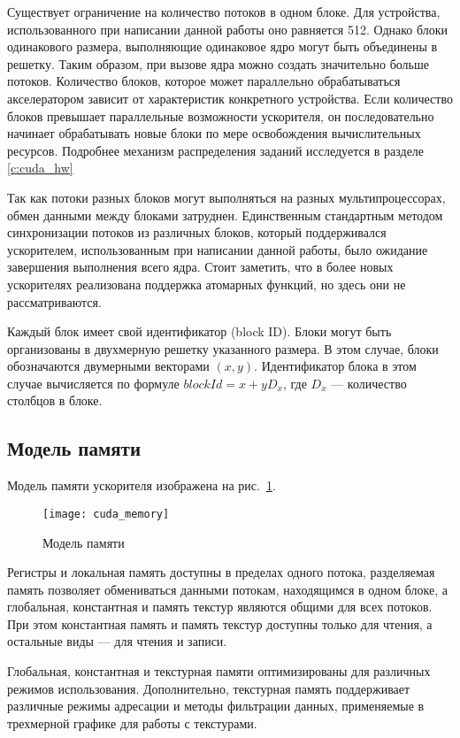 Существует ограничение на количество потоков в одном блоке. Для устройства, использованного при написании данной работы оно равняется 512. Однако блоки одинакового размера, выполняющие одинаковое ядро могут быть объединены в решетку. Таким образом, при вызове ядра можно создать значительно больше потоков. Количество блоков, которое может параллельно обрабатываться акселератором зависит от характеристик конкретного устройства. Если количество блоков превышает параллельные возможности ускорителя, он последовательно начинает обрабатывать новые блоки по мере освобождения вычислительных ресурсов. Подробнее механизм распределения заданий исследуется в разделе \ref{c:cuda_hw}

Так как потоки разных блоков могут выполняться на разных мультипроцессорах, обмен данными между блоками затруднен. Единственным стандартным методом синхронизации потоков из различных блоков, который поддерживался ускорителем, использованным при написании данной работы, было ожидание завершения выполнения всего ядра. Стоит заметить, что в более новых ускорителях реализована поддержка атомарных функций, но здесь они не рассматриваются.

Каждый блок имеет свой идентификатор (block ID). Блоки могут быть организованы в двухмерную решетку указанного размера. В этом случае, блоки обозначаются двумерными векторами $(x, y)$. Идентификатор блока в этом случае вычисляется по формуле $blockId = x + yD_x$, где $D_x$ --- количество столбцов в блоке.

\subsection{Модель памяти}
\label{c:mem_model}
Модель памяти ускорителя изображена на рис.~\ref{fig:cuda_memory}.

\begin{figure}[ht]
\center
\texttt{[image: cuda\_memory]}
\caption{Модель памяти}
\label{fig:cuda_memory}
\end{figure}

Регистры и локальная память доступны в пределах одного потока, разделяемая память позволяет обмениваться данными потокам, находящимся в одном блоке, а глобальная, константная и память текстур являются общими для всех потоков. При этом константная память и память текстур доступны только для чтения, а остальные виды --- для чтения и записи.

Глобальная, константная и текстурная памяти оптимизированы для различных режимов использования. Дополнительно, текстурная память поддерживает различные режимы адресации и методы фильтрации данных, применяемые в трехмерной графике для работы с текстурами.

